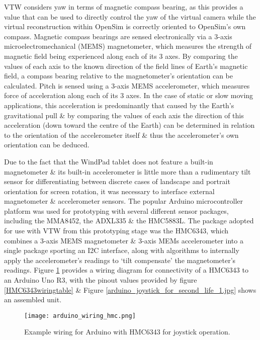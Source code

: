 VTW considers yaw in terms of magnetic compass bearing, as this provides a value that can be used to directly control the yaw of the virtual camera while the virtual reconstruction within OpenSim is correctly oriented to OpenSim's own compass. Magnetic compass bearings are sensed electronically via a 3-axis microelectromechanical (MEMS) magnetometer, which measures the strength of magnetic field being experienced along each of its 3 axes. By comparing the values of each axis to the known direction of the field lines of Earth's magnetic field, a compass bearing relative to the magnetometer's orientation can be calculated. Pitch is sensed using a 3-axis MEMS accelerometer, which measures force of acceleration along each of its 3 axes. In the case of static or slow moving applications, this acceleration is predominantly that caused by the Earth's gravitational pull \& by comparing the values of each axis the direction of this acceleration (down toward the centre of the Earth) can be determined in relation to the orientation of the accelerometer itself \& thus the accelerometer's own orientation can be deduced.

Due to the fact that the WindPad tablet does not feature a built-in magnetometer \& its built-in accelerometer is little more than a rudimentary tilt sensor for differentiating between discrete cases of landscape and portrait orientation for screen rotation, it was necessary to interface external magnetometer \& accelerometer sensors. The popular Arduino\ArduinoFootnote{} microcontroller platform was used for prototyping with several different sensor packages, including the MMA8452\MMAfootnote{}, the ADXL335\ADXLfootnote{} \& the HMC5883L\HMCfootnote{}. The package adopted for use with VTW from this prototyping stage was the HMC6343\HMCtwoFootnote{}, which combines a 3-axis MEMS magnetometer \& 3-axis MEMs accelerometer into a single package sporting an I2C interface, along with algorithms to internally apply the accelerometer's readings to `tilt compensate' the magnetometer's readings. Figure \ref{arduino_wiring_hmc.png} provides a wiring diagram for connectivity of a HMC6343 to an Arduino Uno R3, with the pinout values provided by figure \ref{HMC6343wiringtable} \& Figure \ref{arduino_joystick_for_second_life_1.jpg} shows an assembled unit.

\begin{figure}[h]
\centering
  \texttt{[image: arduino\_wiring\_hmc.png]}
  \caption{Example wiring for Arduino with HMC6343 for joystick operation.}
  \label{arduino_wiring_hmc.png}
\end{figure}

